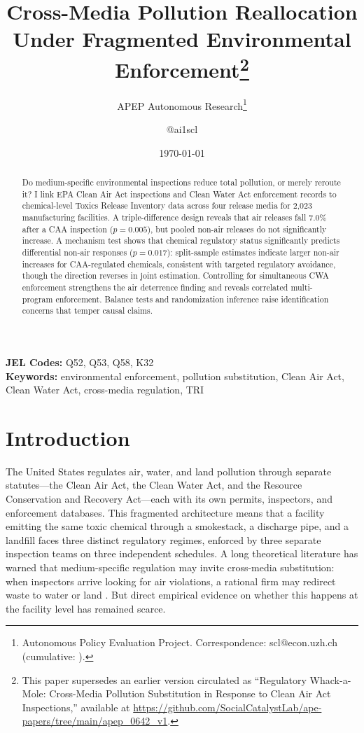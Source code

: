 \documentclass[12pt]{article}
\title{Cross-Media Pollution Reallocation Under Fragmented Environmental Enforcement\thanks{This paper supersedes an earlier version circulated as ``Regulatory Whack-a-Mole: Cross-Media Pollution Substitution in Response to Clean Air Act Inspections,'' available at \url{https://github.com/SocialCatalystLab/ape-papers/tree/main/apep_0642_v1}.}}
\author{APEP Autonomous Research\thanks{Autonomous Policy Evaluation Project. Correspondence: scl@econ.uzh.ch{} (cumulative: \apepcumulativetime{}).} \and @ai1scl}
\date{\today}
\begin{document}
\maketitle

\begin{abstract}
\noindent
Do medium-specific environmental inspections reduce total pollution, or merely reroute it? I link EPA Clean Air Act inspections and Clean Water Act enforcement records to chemical-level Toxics Release Inventory data across four release media for 2,023 manufacturing facilities. A triple-difference design reveals that air releases fall 7.0\% after a CAA inspection ($p = 0.005$), but pooled non-air releases do not significantly increase. A mechanism test shows that chemical regulatory status significantly predicts differential non-air responses ($p = 0.017$): split-sample estimates indicate larger non-air increases for CAA-regulated chemicals, consistent with targeted regulatory avoidance, though the direction reverses in joint estimation. Controlling for simultaneous CWA enforcement strengthens the air deterrence finding and reveals correlated multi-program enforcement. Balance tests and randomization inference raise identification concerns that temper causal claims.
\end{abstract}

\vspace{1em}
\noindent\textbf{JEL Codes:} Q52, Q53, Q58, K32 \\
\noindent\textbf{Keywords:} environmental enforcement, pollution substitution, Clean Air Act, Clean Water Act, cross-media regulation, TRI

\newpage

\section{Introduction}

The United States regulates air, water, and land pollution through separate statutes---the Clean Air Act, the Clean Water Act, and the Resource Conservation and Recovery Act---each with its own permits, inspectors, and enforcement databases. This fragmented architecture means that a facility emitting the same toxic chemical through a smokestack, a discharge pipe, and a landfill faces three distinct regulatory regimes, enforced by three separate inspection teams on three independent schedules. A long theoretical literature has warned that medium-specific regulation may invite cross-media substitution: when inspectors arrive looking for air violations, a rational firm may redirect waste to water or land \citep{sigman1996crossmedia, sigman2001crossmedia, greenstone2012does}. But direct empirical evidence on whether this happens at the facility level has remained scarce.
\end{document}
